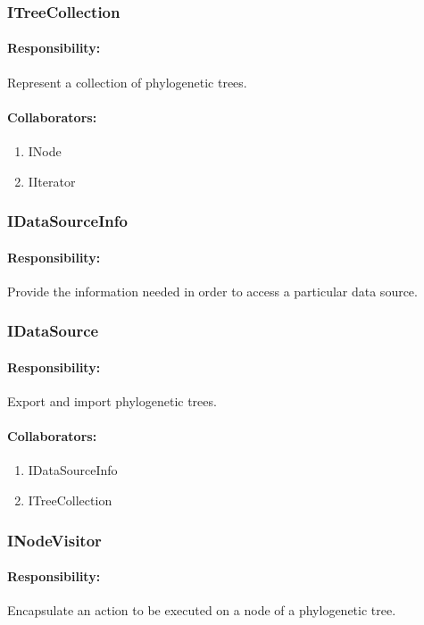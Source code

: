 \documentclass[a4paper,10pt]{article}
\begin{document}
  \subsubsection{ITreeCollection}
    \paragraph{Responsibility:} Represent a collection of phylogenetic trees.
    \paragraph{Collaborators:}
      \begin{enumerate}
       \item INode
       \item IIterator
      \end{enumerate}

  \subsubsection{IDataSourceInfo}
    \paragraph{Responsibility:} Provide the information needed in order to access a particular data source.

  \subsubsection{IDataSource}
    \paragraph{Responsibility:} Export and import phylogenetic trees.
    \paragraph{Collaborators:}
      \begin{enumerate}
       \item IDataSourceInfo
       \item ITreeCollection
      \end{enumerate}

  \subsubsection{INodeVisitor}
    \paragraph{Responsibility:} Encapsulate an action to be executed on a node of a phylogenetic tree.
\end{document}
